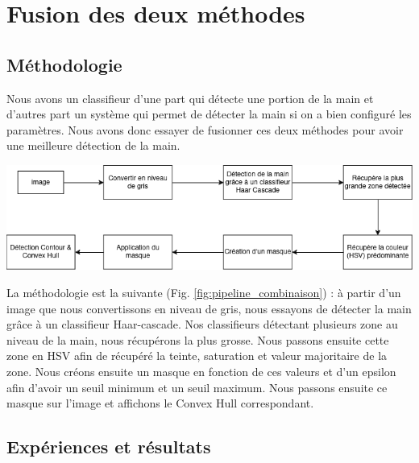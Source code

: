 \documentclass[11pt]{article}
\begin{document}
\section{Fusion des deux méthodes}
\subsection{Méthodologie}
Nous avons un classifieur d'une part qui détecte une portion de la main et d'autres part un système qui permet de détecter la main si on a bien configuré les paramètres. Nous avons donc essayer de fusionner ces deux méthodes pour avoir une meilleure détection de la main. 

\begin{center}
    \includegraphics[width=\textwidth]{images/pipeline_combinaison.png}
    \label{fig:pipeline_combinaison}
\end{center}

La méthodologie est la suivante (Fig. \ref{fig:pipeline_combinaison}) : à partir d'un image que nous convertissons en niveau de gris, nous essayons de détecter la main grâce à un classifieur Haar-cascade. Nos classifieurs détectant plusieurs zone au niveau de la main, nous récupérons la plus grosse. Nous passons ensuite cette zone en HSV afin de récupéré la teinte, saturation et valeur majoritaire de la zone. Nous créons ensuite un masque en fonction de ces valeurs et d'un epsilon afin d'avoir un seuil minimum et un seuil maximum. Nous passons ensuite ce masque sur l'image et affichons le Convex Hull correspondant. \bigbreak 

\subsection{Expériences et résultats}
\end{document}
